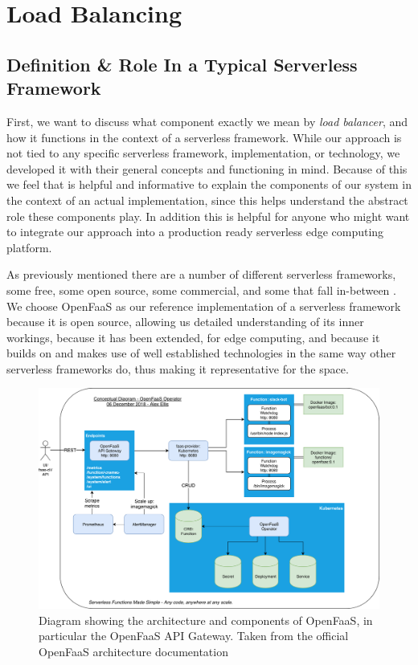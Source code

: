 \section{Load Balancing}

\subsection{ Definition \& Role In a Typical Serverless Framework}
First, we want to discuss what component exactly we mean by \textit{load balancer}, and how it functions in the context of a serverless framework. While our approach is not tied to any specific serverless framework, implementation, or technology, we developed it with their general concepts and functioning in mind. Because of this we feel that is helpful and informative to explain the components of our system in the context of an actual implementation, since this helps understand the abstract role these components play. In addition this is helpful for anyone who might want to integrate our approach into a production ready serverless edge computing platform.

As previously mentioned there are a number of different serverless frameworks, some free, some open source, some commercial, and some that fall in-between\cite{aws-lambda}\cite{azure-functions} \cite{openfaas-gateway}\cite{kubeless}\cite{openwhisk}.
We choose OpenFaaS\cite{openfaas}
as our reference implementation of a serverless framework because it is open source, allowing us detailed understanding of its inner workings, because it has been extended, for edge computing, and because it builds on and makes use of well established technologies in the same way other serverless frameworks do\cite{kubeless}\cite{openwhisk}, thus making it representative for the space.


\begin{figure}
    \centering
    \includegraphics[width=14cm]{graphics/diagrams/openfaas-gateway-architecture.png}
    \caption{Diagram showing the architecture and components of OpenFaaS, in particular the OpenFaaS API Gateway. Taken from the official OpenFaaS architecture documentation\cite{openfaas-gateway}}
    \label{fig:openfaas-gateway-diagram}
\end{figure}


